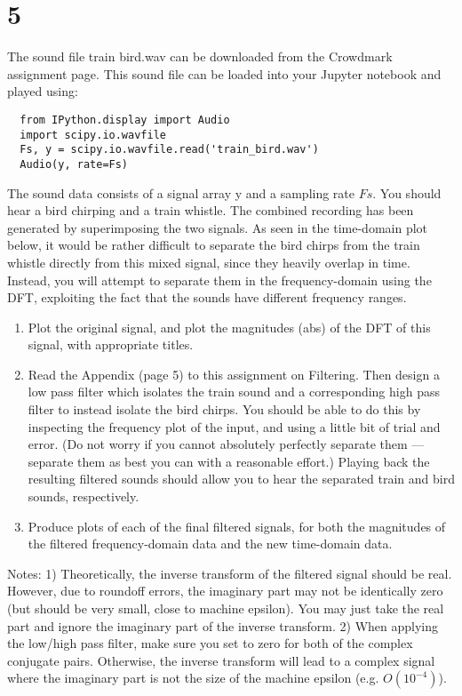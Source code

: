 \documentclass[11pt]{article}
\begin{document}
\newpage

\section{5}

The sound file train bird.wav can be downloaded from the Crowdmark assignment page. This sound file can be loaded into your Jupyter notebook and played using:

\begin{verbatim}
  from IPython.display import Audio
  import scipy.io.wavfile
  Fs, y = scipy.io.wavfile.read('train_bird.wav')
  Audio(y, rate=Fs)
\end{verbatim}

The sound data consists of a signal array y and a sampling rate $Fs$. You should hear a bird chirping and a train whistle. The combined recording has been generated by superimposing the two signals. As seen in the time-domain plot below, it would be rather difficult to separate the bird chirps from the train whistle directly from this mixed signal, since they heavily overlap in time. Instead, you will attempt to separate them in the frequency-domain using the DFT, exploiting the fact that the sounds have different frequency ranges.

\begin{enumerate}
  \item Plot the original signal, and plot the magnitudes (abs) of the DFT of this signal, with appropriate titles.
  \item Read the Appendix (page 5) to this assignment on Filtering. Then design a low pass filter which isolates the train sound and a corresponding high pass filter to instead isolate the bird chirps. You should be able to do this by inspecting the frequency plot of the input, and using a little bit of trial and error. (Do not worry if you cannot absolutely perfectly separate them — separate them as best you can with a reasonable effort.) Playing back the resulting filtered sounds should allow you to hear the separated train and bird sounds, respectively.
  \item Produce plots of each of the final filtered signals, for both the magnitudes of the filtered frequency-domain data and the new time-domain data.
\end{enumerate}

Notes: 1) Theoretically, the inverse transform of the filtered signal should be real. However, due to roundoff errors, the imaginary part may not be identically zero (but should be very small, close to machine epsilon). You may just take the real part and ignore the imaginary part of the inverse transform. 2) When applying the low/high pass filter, make sure you set to zero for both of the complex conjugate pairs. Otherwise, the inverse transform will lead to a complex signal where the imaginary part is not the size of the machine epsilon (e.g. $O(10^{-4})$).
\end{document}
